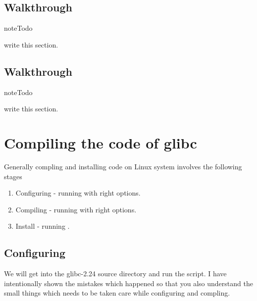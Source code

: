 \documentclass[letterpaper,10pt,english]{sphinxmanual}
\begin{document}
\subsection{Walkthrough }
\label{\detokenize{03_glibc:walkthrough-div}}
\begin{sphinxadmonition}{note}{Todo}

write this section.
\end{sphinxadmonition}


\subsection{Walkthrough }
\label{\detokenize{03_glibc:walkthrough-open}}
\begin{sphinxadmonition}{note}{Todo}

write this section.
\end{sphinxadmonition}


\section{Compiling the code of glibc}
\label{\detokenize{03_glibc:compiling-the-code-of-glibc}}
Generally compling and installing code on Linux system involves the following stages
\begin{enumerate}
\item {} 
Configuring -   running  with right options.

\item {} 
Compiling   -   running  with right options.

\item {} 
Install     -   running .

\end{enumerate}


\subsection{Configuring}
\label{\detokenize{03_glibc:configuring}}
We will get into the glibc-2.24 source directory and run the  script. I have intentionally shown the mistakes which happened so that you also understand the small things which needs to be taken care while configuring and compling.
\end{document}
